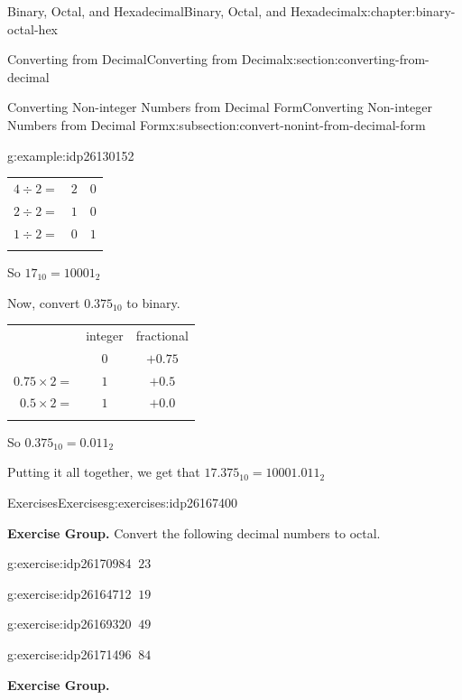 \documentclass[twoside,10pt,]{book}
\newcommand{\tabularfont}{\relax}
\numberwithin{equation}{section}
\newcommand{\hrulemedium}{\noalign{\hrule height 0.07em}}
\newcommand{\hrulethick} {\noalign{\hrule height 0.11em}}
\begin{document}
\begin{chapterptx}{Binary, Octal, and Hexadecimal}{}{Binary, Octal, and Hexadecimal}{}{}{x:chapter:binary-octal-hex}
\begin{sectionptx}{Converting from Decimal}{}{Converting from Decimal}{}{}{x:section:converting-from-decimal}
\begin{subsectionptx}{Converting Non-integer Numbers from Decimal Form}{}{Converting Non-integer Numbers from Decimal Form}{}{}{x:subsection:convert-nonint-from-decimal-form}
\begin{example}{}{g:example:idp26130152}
\begin{center}
{\begin{tabular}{ccc}
\multicolumn{1}{r}{\(4\div 2=\)}&\(2\)&\(0\)\tabularnewline[0pt]
\multicolumn{1}{r}{\(2\div 2 = \)}&\(1\)&\(0\)\tabularnewline[0pt]
\multicolumn{1}{r}{\(1\div 2=\)}&\(0\)&\(1\)\tabularnewline\hrulethick
\end{tabular}
}%
\end{center}%
 So \(17_{10}=10001_2\)%
\par
Now, convert \(0.375_{10}\) to binary. \begin{center}%
{\tabularfont%
\begin{tabular}{ccc}\hrulethick
&integer&fractional\tabularnewline\hrulemedium
\multicolumn{1}{r}{\(0.375\times 2=\)}&\(0\)&\(+0.75\)\tabularnewline[0pt]
\multicolumn{1}{r}{\(0.75\times 2=\)}&\(1\)&\(+0.5\)\tabularnewline[0pt]
\multicolumn{1}{r}{\(0.5\times 2=\)}&\(1\)&\(+0.0\)\tabularnewline\hrulethick
\end{tabular}
}%
\end{center}%
 So \(0.375_{10}=0.011_2\)%
\par
Putting it all together, we get that \(17.375_{10}=10001.011_2\)%
\end{example}
\end{subsectionptx}
%
%
\typeout{************************************************}
\typeout{************************************************}
%
\begin{exercises-subsection}{Exercises}{}{Exercises}{}{}{g:exercises:idp26167400}
\par\medskip\noindent%
\textbf{Exercise Group.}\space\space%
Convert the following decimal numbers to octal.\begin{exercisegroup}
\begin{divisionexerciseeg}{1}{}{}{g:exercise:idp26170984}%
\(\ 23\)\end{divisionexerciseeg}%
\begin{divisionexerciseeg}{2}{}{}{g:exercise:idp26164712}%
\(\ 19\)\end{divisionexerciseeg}%
\begin{divisionexerciseeg}{3}{}{}{g:exercise:idp26169320}%
\(\ 49\)\end{divisionexerciseeg}%
\begin{divisionexerciseeg}{4}{}{}{g:exercise:idp26171496}%
\(\ 84\)\end{divisionexerciseeg}%
\end{exercisegroup}
\par\medskip\noindent
\par\medskip\noindent%
\textbf{Exercise Group.}\space\space%

\end{exercises-subsection}
\end{sectionptx}
\end{chapterptx}
\end{document}
